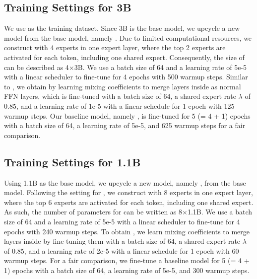 \subsection{Training Settings for \stablecoder 3B}\label{sec:stable_setting}
We use \evolcode as the training dataset. Since \stablecoder 3B is the base model, we upcycle a new \moe model from the base model, namely \textbf{\stablemoe}. Due to limited computational resources, we construct \stablemoe with 4 experts in one expert layer, where the top 2 experts are activated for each token, including one shared expert. Consequently, the size of \stablemoe can be described as 4$\times$3B. We use a batch size of 64 and a learning rate of 5e-5 with a linear scheduler to fine-tune \stablemoe for 4 epochs with 500 warmup steps. Similar to \oursmerge, we obtain \textbf{\stablemerge} by learning mixing coefficients to merge \moe layers inside \stablemoe as normal FFN layers, which is fine-tuned with a batch size of 64, a shared expert rate $\lambda$ of 0.85, and a learning rate of 1e-5 with a linear schedule for 1 epoch with 125 warmup steps. Our baseline model, namely \textbf{\baselinestable}, is fine-tuned for 5 (= 4 + 1) epochs with a batch size of 64, a learning rate of 5e-5, and 625 warmup steps for a fair comparison.

\subsection{Training Settings for \tinyllama 1.1B}\label{sec:tinyllama_setting}
Using \tinyllama 1.1B as the base model, we upcycle a new \moe model, namely \textbf{\tinyllamamoe}, from the base model. Following the setting for \oursmoe, we construct \tinyllamamoe with 8 experts in one expert layer, where the top 6 experts are activated for each token, including one shared expert. As such, the number of parameters for \tinyllamamoe can be written as 8$\times$1.1B. We use a batch size of 64 and a learning rate of 5e-5 with a linear scheduler to fine-tune \tinyllamamoe for 4 epochs with 240 warmup steps. To obtain \textbf{\tinyllamamerge}, we learn mixing coefficients to merge \moe layers inside \tinyllamamoe by fine-tuning them with a batch size of 64, a shared expert rate $\lambda$ of 0.85, and a learning rate of 2e-5 with a linear schedule for 1 epoch with 60 warmup steps. For a fair comparison, we fine-tune a baseline model \textbf{\baselinetinyllama} for 5 (= 4 + 1) epochs with a batch size of 64, a learning rate of 5e-5, and 300 warmup steps.

